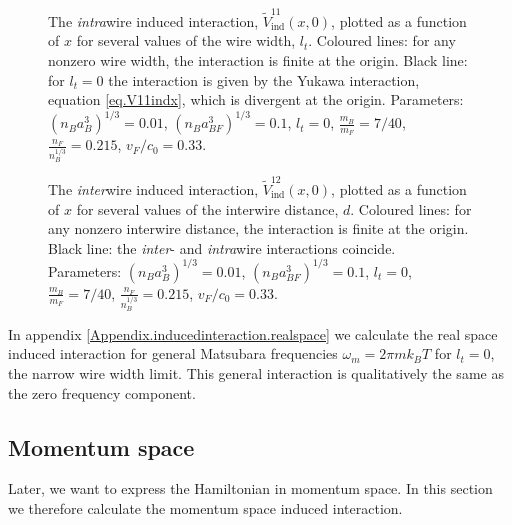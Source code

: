 \begin{figure} 
\begin{center}
  
\caption{The \textit{intra}wire induced interaction, $\tilde{V}^{11}_{\text{ind}}(x, 0)$, plotted as a function of $x$ for several values of the wire width, $l_t$. Coloured lines: for any nonzero wire width, the interaction is finite at the origin. Black line: for $l_t = 0$ the interaction is given by the Yukawa interaction, equation \eqref{eq.V11indx}, which is divergent at the origin. Parameters: $(n_Ba_B^3)^{1/3} = 0.01$, $(n_Ba_{BF}^3)^{1/3} = 0.1$, $l_t = 0$, $\frac{m_B}{m_F} = 7/40$, $\frac{n_F}{n_B^{1/3}} = 0.215$, $v_F/c_0 = 0.33$.}
\label{fig.V11indx}   
\vspace{0.5cm}
  
\caption{The \textit{inter}wire induced interaction, $\tilde{V}^{12}_{\text{ind}}(x, 0)$, plotted as a function of $x$ for several values of the interwire distance, $d$. Coloured lines: for any nonzero interwire distance, the interaction is finite at the origin. Black line: the \textit{inter}- and \textit{intra}wire interactions coincide. \\ Parameters: $(n_Ba_B^3)^{1/3} = 0.01$, $(n_Ba_{BF}^3)^{1/3} = 0.1$, $l_t = 0$, $\frac{m_B}{m_F} = 7/40$, $\frac{n_F}{n_B^{1/3}} = 0.215$, $v_F/c_0 = 0.33$.}  
\label{fig.V12indx}  
\end{center}    
\end{figure}

In appendix \ref{Appendix.inducedinteraction.realspace} we calculate the real space induced interaction for general Matsubara frequencies $\omega_m = 2\pi m k_BT$ for $l_t = 0$, the narrow wire width limit. This general interaction is qualitatively the same as the zero frequency component.  

\subsection{Momentum space}
\label{subsec.inducedinteraction.momentumspace}
Later, we want to express the Hamiltonian in momentum space. In this section we therefore calculate the momentum space induced interaction. 

